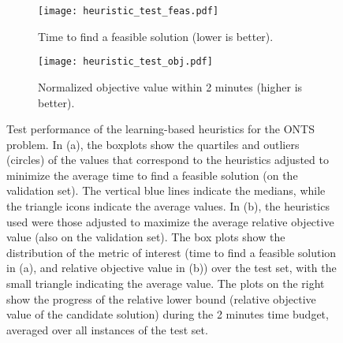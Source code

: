 \begin{figure}[h]
    \centering
    \begin{subfigure}{0.99\textwidth}
        \centering
        \texttt{[image: heuristic\_test\_feas.pdf]}
        \caption{Time to find a feasible solution (lower is better).}
        \label{fig:heuristics-test-results-feas}
    \end{subfigure}
    \begin{subfigure}{0.99\textwidth}
        \centering
        \texttt{[image: heuristic\_test\_obj.pdf]}
        \caption{Normalized objective value within 2 minutes (higher is better).}
        \label{fig:heuristics-test-results-obj}
    \end{subfigure}
    \caption{%
    Test performance of the learning-based heuristics for the ONTS problem.
    In (a), the boxplots show the quartiles and outliers (circles) of the values that correspond to the heuristics adjusted to minimize the average time to find a feasible solution (on the validation set).
    The vertical blue lines indicate the medians, while the triangle icons indicate the average values.
    In (b), the heuristics used were those adjusted to maximize the average relative objective value (also on the validation set).
    The box plots show the distribution of the metric of interest (time to find a feasible solution in (a), and relative objective value in (b)) over the test set, with the small triangle indicating the average value.
    The plots on the right show the progress of the relative lower bound (relative objective value of the candidate solution) during the 2 minutes time budget, averaged over all instances of the test set.
}
    \label{fig:heuristics-test-results}
\end{figure}

